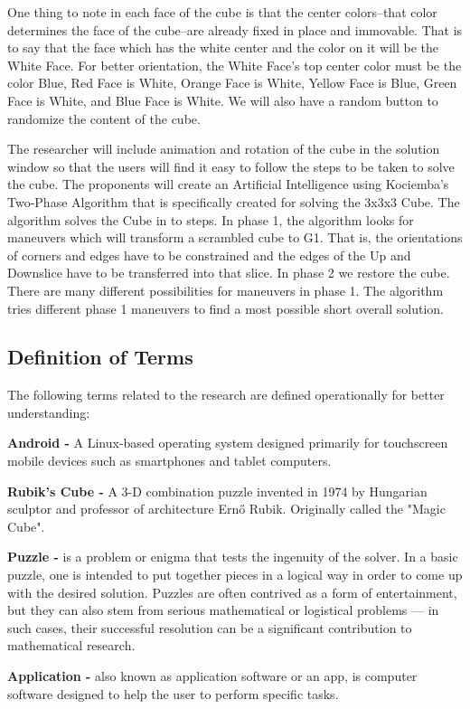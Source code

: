One thing to note in each face of the cube is that the center colors--that color determines the face of the cube--are already fixed in place and immovable. That is to say that the face which has the white center and the color on it will be the White Face. For better orientation, the White Face’s top center color must be the color Blue, Red Face is White, Orange Face is White, Yellow Face is Blue, Green Face is White, and Blue Face is White. We will also have a random button to randomize the content of the cube.

The researcher will include animation and rotation of the cube in the solution window so that the users will find it easy to follow the steps to be taken to solve the cube. The proponents will create an Artificial Intelligence using Kociemba’s Two-Phase Algorithm that is specifically created for solving the 3x3x3 Cube. The algorithm solves the Cube in to steps. In phase 1, the algorithm looks for maneuvers which will transform a scrambled cube to G1. That is, the orientations of corners and edges have to be constrained and the edges of the Up and Downslice have to be transferred into that slice. In phase 2 we restore the cube. There are many different possibilities for maneuvers in phase 1. The algorithm tries different phase 1 maneuvers to find a most possible short overall solution.


\subsection{Definition of Terms}
\vspace{-3ex}
The following terms related to the research are defined operationally for better understanding:


\noindent\textbf {Android - } A Linux-based operating system designed primarily for touchscreen mobile devices such as smartphones and tablet computers.

\noindent\textbf{Rubik’s Cube - } A 3-D combination puzzle invented in 1974 by Hungarian sculptor and professor of architecture Ernő Rubik. Originally called the "Magic Cube".

\noindent\textbf{Puzzle - } is a problem or enigma that tests the ingenuity of the solver.  In a basic puzzle, one is intended to put together pieces in a logical way in order to come up with the desired solution.  Puzzles are often contrived as a form of entertainment, but they can also stem from serious mathematical or logistical problems — in such cases, their successful resolution can be a significant contribution to mathematical research.

\noindent\textbf{Application - } also known as application software or an app, is computer software designed to help the user to perform specific tasks.

